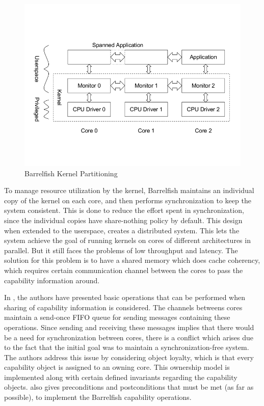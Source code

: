 \begin{figure}[h]
 \centering
\includegraphics[scale=0.25]{img/BF_sharing_res}
\caption{Barrelfish Kernel Partitioning}
\label{kernelpartition}
\end{figure}
To manage resource utilization by the kernel, Barrelfish maintains an individual copy of the kernel on each core, and then performs synchronization to keep the system consistent. This is done to reduce the effort spent in synchronization, since the individual  copies have share-nothing policy by default. This design when extended to the userspace, creates a distributed system. This lets the system achieve the goal of running kernels on cores of different architectures in parallel. But it still faces the problems of low throughput and latency. The solution for this problem is to have a shared memory which does cache coherency, which requires certain communication channel between the cores to pass the capability information around. 

In \cite{nevillmasters}, the authors have presented basic operations that can be performed when sharing of capability information is considered. The channels betweens cores maintain a send-once FIFO queue for sending messages containing these operations. Since sending and receiving these messages implies that there would be a need for synchronization between cores, there is a conflict which arises due to the fact that the initial goal was to maintain a synchronization-free system. The authors address this issue by considering object loyalty, which is that every capability object is assigned to an owning core. This ownership model is implemented along with certain defined invariants regarding the capability objects. \cite{nevillmasters} also gives preconditions and postconditions that must be met (as far as possible), to implement the Barrelfish capability operations.

